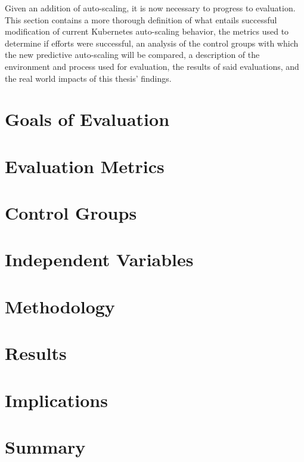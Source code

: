Given an addition of auto-scaling, it is now necessary to progress to
evaluation. This section contains a more thorough definition of what entails
successful modification of current Kubernetes auto-scaling behavior, the metrics
used to determine if efforts were successful, an analysis of the control groups
with which the new predictive auto-scaling will be compared, a description of
the environment and process used for evaluation, the results of said
evaluations, and the real world impacts of this thesis' findings.

\section{Goals of Evaluation}



\section{Evaluation Metrics}



\section{Control Groups}



\section{Independent Variables}



\section{Methodology}



\section{Results}



\section{Implications}



\section{Summary}


